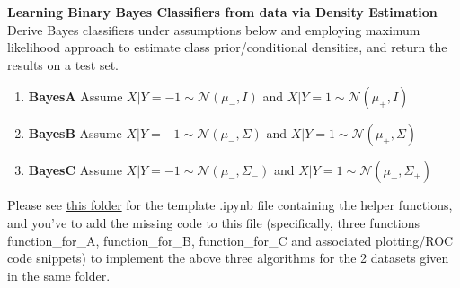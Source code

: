 \documentclass[solution,addpoints,12pt]{exam}
\begin{document}
\begin{questions}


\textbf{Learning Binary Bayes Classifiers from data via Density Estimation}\\
Derive Bayes classifiers under assumptions below and employing maximum likelihood approach to estimate class prior/conditional densities, and return the results on a test set.
\begin{enumerate}
\item \textbf{BayesA} Assume $X|Y=-1 \sim \mathcal{N}(\mu_-, I)$ and  $X|Y=1 \sim \mathcal{N}(\mu_+, I)$ 
\item \textbf{BayesB} Assume $X|Y=-1 \sim \mathcal{N}(\mu_-, \Sigma)$ and $X|Y=1 \sim \mathcal{N}(\mu_+, \Sigma)$ 
\item \textbf{BayesC} Assume $X|Y=-1 \sim \mathcal{N}(\mu_-, \Sigma_-)$ and $X|Y=1 \sim \mathcal{N}(\mu_+, \Sigma_+)$ 
\end{enumerate}
Please see \href{https://drive.google.com/drive/folders/1MDxrvvLGkw9fjpII0eRzfPZ6iJV4MoQN?usp=sharing}{this folder} for the template .ipynb file containing the helper functions, and you've to add the missing code to this file (specifically, three functions function\_for\_A, function\_for\_B, function\_for\_C and associated plotting/ROC code snippets) to implement the above three algorithms for the 2 datasets given in the same folder. 


\end{questions}
\end{document}
